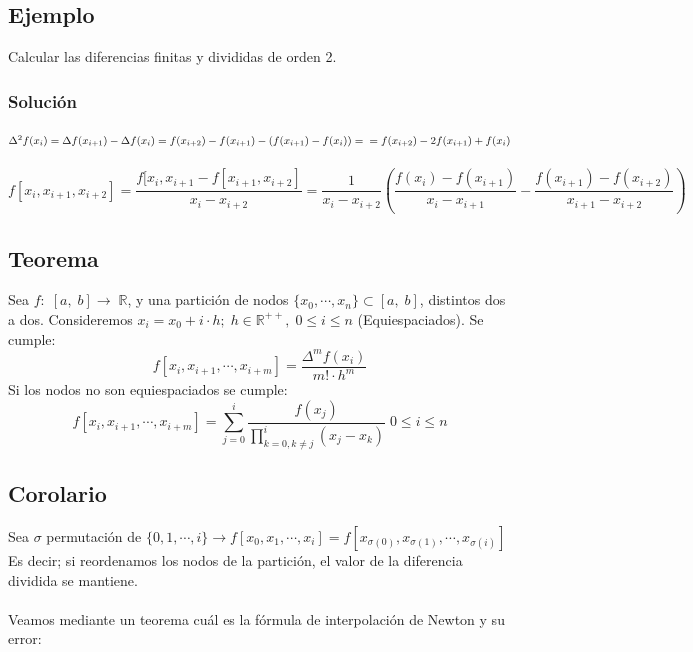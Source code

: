 \documentclass[12pt,a4paper,oneside]{scrbook}
\newcounter{ns}
\begin{document}
\subsection*{Ejemplo}
Calcular las diferencias finitas y divididas de orden 2.
\subsubsection*{Solución}
$\Delta^2f(x_i)=\Delta f(x_{i+1})-\Delta f(x_i)=f(x_{i+2})-f(x_{i+1})-\left( f(x_{i+1})-f(x_i) \right)=\\=f(x_{i+2})-2f(x_{i+1})+f(x_i)$\\ \\
$f[x_i,x_{i+1},x_{i+2}]=\dfrac{f[x_i,x_{i+1}-f[x_{i+1},x_{i+2}]}{x_i-x_{i+2}}=\dfrac{1}{x_i-x_{i+2}}\left( \dfrac{f(x_i)-f(x_{i+1})}{x_i-x_{i+1}}-\dfrac{f(x_{i+1})-f(x_{i+2})}{x_{i+1}-x_{i+2}} \right)$

\subsection*{Teorema}
Sea $f:\;[a,\;b]\longrightarrow\;\mathbb{R}$, y una partición de nodos $\{ x_0,\cdots ,x_n \}\subset [a,\;b]$, distintos dos a dos. Consideremos $x_i=x_0+i\cdot h;\;h\in\mathbb{R}^{++},\;0\leq i\leq n$ (Equiespaciados). Se cumple:
$$
f[x_i,x_{i+1},\cdots ,x_{i+m}]=\dfrac{\Delta^mf(x_i)}{m!\cdot h^m}
$$
Si los nodos no son equiespaciados se cumple:
$$
f[x_i,x_{i+1},\cdots ,x_{i+m}]=\sum\limits_{j=0}^i \dfrac{f(x_j)}{\prod\limits_{k=0,k\neq j}^i (x_j-x_k)}\;0\leq i\leq n
$$
\subsection*{Corolario}
Sea $\sigma$ permutación de $\{0,1,\cdots ,i\}\rightarrow f[x_0,x_1,\cdots ,x_i]=f[x_{\sigma (0)},x_{\sigma (1)},\cdots ,x_{\sigma (i)}]$\\
Es decir; si reordenamos los nodos de la partición, el valor de la diferencia dividida se mantiene.\\ \\
Veamos mediante un teorema cuál es la fórmula de interpolación de Newton y su error:
\end{document}
